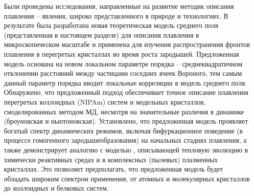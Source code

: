 Были проведены исследования, направленные на развитие методик описания плавления -- явления, широко представленного в природе и технологиях. В результате была разработана новая теоретическая модель среднего поля (представленная в настоящем разделе) для описания плавления в микроскопическом масштабе и применена для изучения распространения фронтов плавления в перегретых кристаллах во время роста зародышей.
Предложенная модель основана на новом локальном параметре порядка -- среднеквадратичном отклонении расстояний между частицами соседних ячеек Вороного, тем самым данный параметр порядка вводит локальные корреляции в модель среднего поля.
Обнаружено, что предложенный подход обеспечивает точное описание плавления перегретых коллоидных (NIPAm) систем и модельных кристаллов, смоделированных методом МД, несмотря на значительные различия в динамике (броуновская и ньютоновская).
Установлено, что предложенная модель проявляет богатый спектр динамических режимов, включая бифуркационное поведение (в процессе гомогенного зародышеобразования) на начальных стадиях плавления, а также демонстрирует аналогию с моделью \cite{10.1103/physreve.96.043201, 10.1103/physreve.100.023203}, описывающей тепловую эволюцию в химически реактивных средах и в комплексных (пылевых) плазменных кристаллах.
Это позволяет предполагать, что предложенная модель будет обладать широким спектром применения, от атомных и молекулярных кристаллов до коллоидных и белковых систем.



